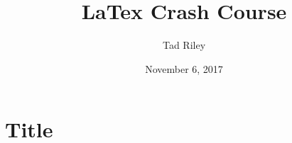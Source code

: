 \documentclass[12pt]{article}
\title{LaTex Crash Course}
\author{Tad Riley}
\date{November 6, 2017}
\begin{document}
\newpage

\section{Title}
\end{document}

